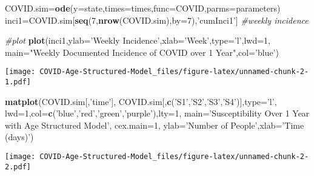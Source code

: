 \documentclass[
]{article}
\newenvironment{Shaded}{\begin{snugshade}}{\end{snugshade}}
\newcommand{\CommentTok}[1]{\textcolor[rgb]{0.56,0.35,0.01}{\textit{#1}}}
\newcommand{\DataTypeTok}[1]{\textcolor[rgb]{0.13,0.29,0.53}{#1}}
\newcommand{\DecValTok}[1]{\textcolor[rgb]{0.00,0.00,0.81}{#1}}
\newcommand{\KeywordTok}[1]{\textcolor[rgb]{0.13,0.29,0.53}{\textbf{#1}}}
\newcommand{\NormalTok}[1]{#1}
\newcommand{\StringTok}[1]{\textcolor[rgb]{0.31,0.60,0.02}{#1}}
\begin{document}
\begin{Shaded}
\begin{Highlighting}[]
\NormalTok{COVID.sim=}\KeywordTok{ode}\NormalTok{(}\DataTypeTok{y=}\NormalTok{state,}\DataTypeTok{times=}\NormalTok{times,}\DataTypeTok{func=}\NormalTok{COVID,}\DataTypeTok{parms=}\NormalTok{parameters)}
\NormalTok{inci1=COVID.sim[}\KeywordTok{seq}\NormalTok{(}\DecValTok{7}\NormalTok{,}\KeywordTok{nrow}\NormalTok{(COVID.sim),}\DataTypeTok{by=}\DecValTok{7}\NormalTok{),}\StringTok{'cumInci1'}\NormalTok{] }\CommentTok{#weekly incidence}

\CommentTok{#plot}
\KeywordTok{plot}\NormalTok{(inci1,}\DataTypeTok{ylab=}\StringTok{'Weekly Incidence'}\NormalTok{,}\DataTypeTok{xlab=}\StringTok{'Week'}\NormalTok{,}\DataTypeTok{type=}\StringTok{'l'}\NormalTok{,}\DataTypeTok{lwd=}\DecValTok{1}\NormalTok{, }\DataTypeTok{main=}\StringTok{"Weekly Documented Incidence of COVID over 1 Year"}\NormalTok{,}\DataTypeTok{col=}\StringTok{'blue'}\NormalTok{)}
\end{Highlighting}
\end{Shaded}

\texttt{[image: COVID-Age-Structured-Model\_files/figure-latex/unnamed-chunk-2-1.pdf]}

\begin{Shaded}
\begin{Highlighting}[]
\KeywordTok{matplot}\NormalTok{(COVID.sim[,}\StringTok{'time'}\NormalTok{], COVID.sim[,}\KeywordTok{c}\NormalTok{(}\StringTok{'S1'}\NormalTok{,}\StringTok{'S2'}\NormalTok{,}\StringTok{'S3'}\NormalTok{,}\StringTok{'S4'}\NormalTok{)],}\DataTypeTok{type=}\StringTok{'l'}\NormalTok{, }
        \DataTypeTok{lwd=}\DecValTok{1}\NormalTok{,}\DataTypeTok{col=}\KeywordTok{c}\NormalTok{(}\StringTok{'blue'}\NormalTok{,}\StringTok{'red'}\NormalTok{,}\StringTok{'green'}\NormalTok{,}\StringTok{'purple'}\NormalTok{),}\DataTypeTok{lty=}\DecValTok{1}\NormalTok{, }\DataTypeTok{main=}\StringTok{'Susceptibility Over 1 Year with Age Structured Model'}\NormalTok{, }\DataTypeTok{cex.main=}\DecValTok{1}\NormalTok{,}
        \DataTypeTok{ylab=}\StringTok{'Number of People'}\NormalTok{,}\DataTypeTok{xlab=}\StringTok{'Time (days)'}\NormalTok{)}
\end{Highlighting}
\end{Shaded}

\texttt{[image: COVID-Age-Structured-Model\_files/figure-latex/unnamed-chunk-2-2.pdf]}
\end{document}
